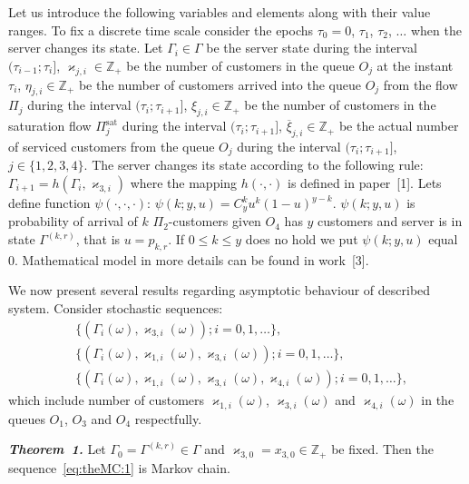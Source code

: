 Let us  introduce the following variables and elements along with their
value ranges. To fix a discrete time scale consider the epochs $\tau_0=0$, $\tau_1$, $\tau_2$,
$\ldots$ when the server changes its state. Let $\Gamma_i\in\Gamma$ be the server state
during the interval $(\tau_{i-1};\tau_i]$, $\varkappa_{j,i} \in \mathbb{Z}_+ $ be the number of customers in
the queue $O_j$ at the instant $\tau_i$, $\eta_{j,i} \in \mathbb{Z}_+$ be the number of customers
arrived into the queue $O_j$ from the flow $\Pi_j$ during the interval $(\tau_{i};\tau_{i+1}]$, $\xi_{j,i} \in
\mathbb{Z}_+$ be the number of customers in the saturation flow $\Pi^{\mathrm{\text{sat}}}_j$ during
the interval $(\tau_{i};\tau_{i+1}]$, $\overline{\xi}_{j,i}\in \mathbb{Z}_+$ be the actual number of 
serviced customers from the queue  $O_j$ during the interval $(\tau_{i};\tau_{i+1}]$, $j\in
\{1,2,3,4\}$.
The server changes its state according to the following rule:
$
\Gamma_{i+1}=h(\Gamma_i,\varkappa_{3,i})
$
where the mapping $h(\cdot,\cdot)$ is defined in paper~[1].
Lets define function $\psi(\cdot,\cdot,\cdot)$: $\psi(k;y,u)=C_y^k u^k (1-u)^{y-k}$.
$\psi(k;y,u)$ is probability of arrival of $k$ $\Pi_2$-customers given $O_4$ has $y$ customers and server is in state $\Gamma^{(k,r)}$, that is $u=p_{k,r}$. If $ 0\leqslant k \leqslant y$ does no hold we put $\psi(k;y,u)$ equal $0$.
Mathematical model in more details can be found in work~[3].


We now present several results regarding asymptotic behaviour of described system.
Consider stochastic sequences:
\begin{align}
\label{eq:theMC:1}
&\{(\Gamma_i(\omega), \varkappa_{3,i}(\omega)); i =0, 1, \ldots\},\\
\label{eq:theMC:2}
&\{(\Gamma_i(\omega), \varkappa_{1,i}(\omega),\varkappa_{3,i}(\omega)); i =0, 1, \ldots\},\\
\label{eq:theMC:3}
&\{(\Gamma_i(\omega), \varkappa_{1,i}(\omega),\varkappa_{3,i}(\omega),\varkappa_{4,i}(\omega)); i =0, 1, \ldots\},
\end{align}
which include number of customers $\varkappa_{1, i}(\omega)$, $\varkappa_{3, i}(\omega)$ and $\varkappa_{4, i}(\omega)$ in the queues $O_1$, $O_3$ and $O_4$ respectfully.

\textit{\textbf{Theorem~1.}} 
Let $\Gamma_0=\Gamma^{(k,r)}\in \Gamma$ and $\varkappa_{3,0}=x_{3,0}\in \mathbb{Z}_+$ be fixed. Then the sequence~\eqref{eq:theMC:1} is Markov chain.

